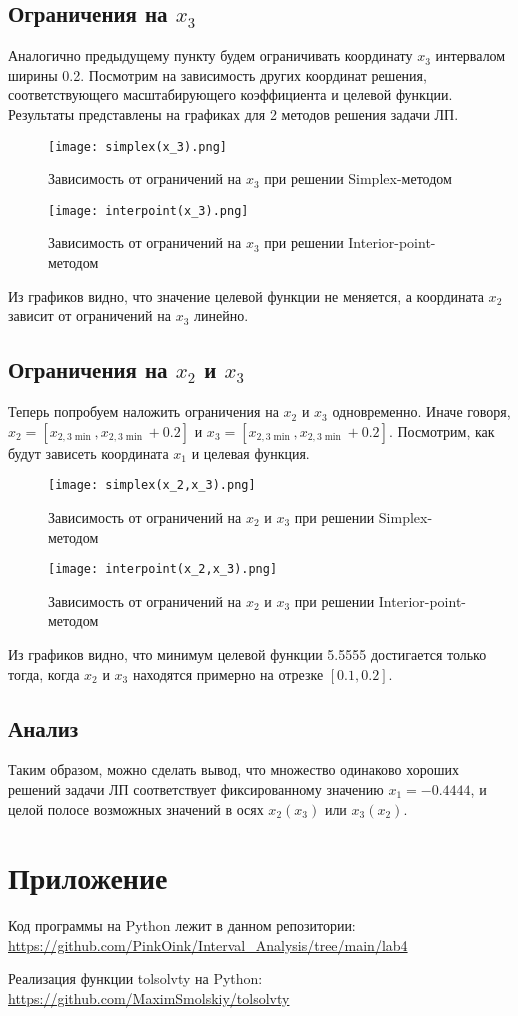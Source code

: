 \subsection{Ограничения на $x_3$}
Аналогично предыдущему пункту будем ограничивать координату $x_3$ интервалом ширины 0.2. Посмотрим на зависимость других координат решения, соответствующего масштабирующего коэффициента и целевой функции. Результаты представлены на графиках для 2 методов решения задачи ЛП. \\
\begin{figure}[h]
	\centering
	\texttt{[image: simplex(x\_3).png]}
	\caption{Зависимость от ограничений на $x_3$ при решении Simplex-методом}
\end{figure}
\newpage
\begin{figure}[h]
	\centering
	\texttt{[image: interpoint(x\_3).png]}
	\caption{Зависимость от ограничений на $x_3$ при решении Interior-point-методом}
\end{figure}
Из графиков видно, что значение целевой функции не меняется, а координата $x_2$ зависит от ограничений на $x_3$ линейно.

\subsection{Ограничения на $x_2$ и $x_3$}
Теперь попробуем наложить ограничения на $x_2$ и $x_3$ одновременно. Иначе говоря, $x_2=[x_{2,3 \min}, x_{2,3 \min} + 0.2]$ и $x_3=[x_{2,3 \min}, x_{2,3 \min} + 0.2]$. Посмотрим, как будут зависеть координата $x_1$ и целевая функция.
\begin{figure}[h]
	\centering
	\texttt{[image: simplex(x\_2,x\_3).png]}
	\caption{Зависимость от ограничений на $x_2$ и $x_3$ при решении Simplex-методом}
\end{figure}
\newpage
\begin{figure}[h]
	\centering
	\texttt{[image: interpoint(x\_2,x\_3).png]}
	\caption{Зависимость от ограничений на $x_2$ и $x_3$ при решении Interior-point-методом}
\end{figure}
Из графиков видно, что минимум целевой функции 5.5555 достигается только тогда, когда $x_2$ и $x_3$ находятся примерно на отрезке $[0.1, 0.2]$.

\subsection{Анализ}
Таким образом, можно сделать вывод, что множество одинаково хороших решений задачи ЛП соответствует фиксированному значению $x_1=-0.4444$, и целой полосе возможных значений в осях $x_2(x_3)$ или $x_3(x_2)$.



\section{Приложение}
Код программы на Python лежит в данном репозитории: \\
\url{https://github.com/PinkOink/Interval_Analysis/tree/main/lab4}{}

Реализация функции tolsolvty на Python: \\
\url{https://github.com/MaximSmolskiy/tolsolvty}{}



